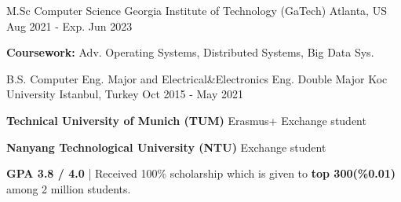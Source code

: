 \begin{cventries}
\vspace{2mm}
\cventry
    {M.Sc Computer Science } %
    {Georgia Institute of Technology (GaTech)} %
    {Atlanta, US} %
    {Aug 2021 - Exp. Jun 2023} %
    {\begin{cvghostitems} %
        \item {\textbf{Coursework:} Adv. Operating Systems, Distributed Systems, Big Data Sys. }
      \end{cvghostitems}
    }
\vspace{-1mm}
\vspace{-1mm}
\cvopenentry
    {B.S. Computer Eng. Major and Electrical\&Electronics Eng. Double Major} %
    {Koc University } %
    {Istanbul, Turkey} %
    {Oct 2015 - May 2021} %
    {\begin{cvghostitems} %
        \item {\textbf{Technical University of Munich (TUM)} Erasmus+ Exchange student 
        }
        \item {\textbf{Nanyang Technological University (NTU)} Exchange student 
        }
        \item {\textbf{GPA 3.8 / 4.0} | Received 100\% scholarship which is given to \textbf{top 300(\%0.01)} among 2 million students.}
      \end{cvghostitems}
    }
\end{cventries}
